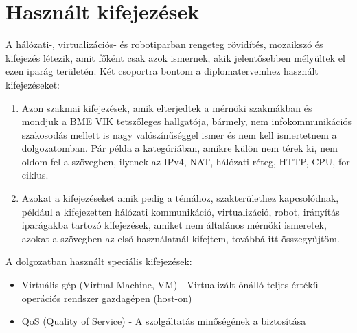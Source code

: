 \section{Használt kifejezések}
A hálózati-, virtualizációs- és robotiparban rengeteg rövidítés, mozaikszó és kifejezés létezik, amit főként csak azok ismernek, akik
jelentősebben mélyültek el ezen iparág területén. Két csoportra bontom a diplomatervemhez használt kifejezéseket:
\begin{enumerate}
	\item Azon szakmai kifejezések, amik elterjedtek a mérnöki szakmákban és mondjuk a BME VIK tetszőleges hallgatója, bármely, nem infokommunikációs szakosodás mellett is nagy valószínűséggel ismer és nem kell ismertetnem a dolgozatomban. Pár példa a kategóriában, amikre külön nem térek ki, nem oldom fel a szövegben, ilyenek az IPv4, NAT, hálózati réteg, HTTP, CPU, for ciklus.
	\item Azokat a kifejezéseket amik pedig a témához, szakterülethez kapcsolódnak, például a kifejezetten hálózati kommunikáció, virtualizáció, robot, irányítás iparágakba tartozó kifejezések, amiket nem általános mérnöki ismeretek, azokat a szövegben az első használatnál kifejtem, továbbá itt összegyűjtöm.
\end{enumerate}
A dolgozatban használt speciális kifejezések:
\begin{itemize}
	\item Virtuális gép (Virtual Machine, VM) - Virtualizált önálló teljes értékű operációs rendszer gazdagépen (host-on)
	\item QoS (Quality of Service) - A szolgáltatás minőségének a biztosítása
\end{itemize}